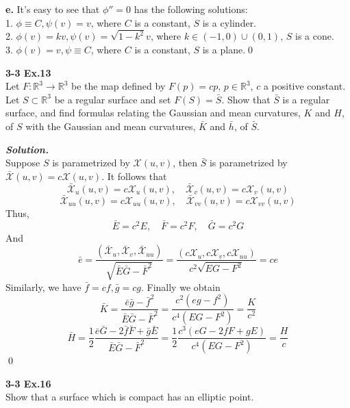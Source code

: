 \documentclass{article}
\begin{document}
\par
\textbf{e. } It's easy to see that $\phi'' = 0$ has the following solutions:\\
1. $\phi \equiv C, \psi(v) = v$, where $C$ is a constant, $S$ is a cylinder.\\
2. $\phi(v) = kv, \psi(v) = \sqrt{1-k^2}v$, where $k \in (-1, 0) \cup (0, 1)$, $S$ is a cone.\\
3. $\phi(v) = v, \psi \equiv C$, where $C$ is a constant, $S$ is a plane.\qed

\par
\textbf{3-3 Ex.13}\\
Let $F: \mathbb{R}^3 \to \mathbb{R}^3$ be the map defined by $F(p)=cp$, $p \in \mathbb{R}^3$,
$c$ a positive constant. Let $S \subset \mathbb{R}^3$ be a regular surface and set
$F(S) = \bar{S}$. Show that $\bar{S}$ is a regular surface, and find formulas relating
the Gaussian and mean curvatures, $K$ and $H$, of $S$ with the Gaussian and mean
curvatures, $\bar{K}$ and $\bar{h}$, of $\bar{S}$.

\par
\textbf{\textit{Solution.}}\\
Suppose $S$ is parametrized by $\mathcal{X}(u,v)$, then $\bar S$ is parametrized by
$\bar{\mathcal{X}}(u,v)=c\mathcal{X}(u, v)$. It follows that
$$
    \bar{\mathcal{X}}_u(u,v) = c \mathcal{X}_u(u, v), \quad
    \bar{\mathcal{X}}_v(u,v) = c \mathcal{X}_v(u, v)
$$
$$
    \bar{\mathcal{X}}_{uu}(u,v) = c \mathcal{X}_{uu}(u, v), \quad
    \bar{\mathcal{X}}_{vv}(u,v) = c \mathcal{X}_{vv}(u, v)
$$
Thus,
$$
    \bar{E} = c^2 E, \quad \bar{F} = c^2F, \quad \bar{G} = c^2G
$$
And
$$
    \bar{e} = \frac{(\bar{\mathcal{X}}_u, \bar{\mathcal{X}}_v, \bar{\mathcal{X}}_{uu})}{\sqrt{\bar{E}\bar{G} - \bar{F}^2}}
    = \frac{(c\mathcal{X}_u, c\mathcal{X}_v, c\mathcal{X}_{uu})}{c^2 \sqrt{EG-F^2}} = ce
$$
Similarly, we have $\bar{f} = cf, \bar{g} = cg$.
Finally we obtain
$$
    \bar{K} = \frac{\bar{e}\bar{g} - \bar{f}^2}{\bar{E}\bar{G}-\bar{F}^2}
    = \frac{c^2(eg - f^2)}{c^4(EG - F^2)} = \frac{K}{c^2}
$$
$$
    \bar{H} = \frac{1}{2} \frac{\bar{e}\bar{G}-2\bar{f}\bar{F}+\bar{g}\bar{E}}{\bar{E}\bar{G}-\bar{F}^2}
    = \frac{1}{2}\frac{c^3(eG-2fF+gE)}{c^4(EG-F^2)} = \frac{H}{c}
$$
\qed

\par
\textbf{3-3 Ex.16}\\
Show that a surface which is compact has an elliptic point.
\end{document}
